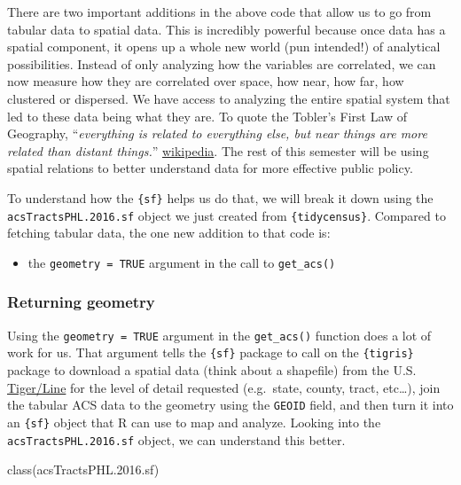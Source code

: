 \documentclass[
]{article}
\newenvironment{Shaded}{\begin{snugshade}}{\end{snugshade}}
\newcommand{\FloatTok}[1]{\textcolor[rgb]{0.00,0.00,0.81}{#1}}
\newcommand{\FunctionTok}[1]{\textcolor[rgb]{0.00,0.00,0.00}{#1}}
\newcommand{\NormalTok}[1]{#1}
\providecommand{\tightlist}{%
  \setlength{\itemsep}{0pt}\setlength{\parskip}{0pt}}
\begin{document}
There are two important additions in the above code that allow us to go
from tabular data to spatial data. This is incredibly powerful because
once data has a spatial component, it opens up a whole new world (pun
intended!) of analytical possibilities. Instead of only analyzing how
the variables are correlated, we can now measure how they are correlated
over space, how near, how far, how clustered or dispersed. We have
access to analyzing the entire spatial system that led to these data
being what they are. To quote the Tobler's First Law of Geography,
``\emph{everything is related to everything else, but near things are
more related than distant things.}''
\href{https://en.wikipedia.org/wiki/Tobler\%27s_first_law_of_geography}{wikipedia}.
The rest of this semester will be using spatial relations to better
understand data for more effective public policy.

To understand how the \texttt{\{sf\}} helps us do that, we will break it
down using the \texttt{acsTractsPHL.2016.sf} object we just created from
\texttt{\{tidycensus\}}. Compared to fetching tabular data, the one new
addition to that code is:

\begin{itemize}
\tightlist
\item
  the \texttt{geometry\ =\ TRUE} argument in the call to
  \texttt{get\_acs()}
\end{itemize}

\hypertarget{returning-geometry}{%
\subsubsection{Returning geometry}\label{returning-geometry}}

Using the \texttt{geometry\ =\ TRUE} argument in the \texttt{get\_acs()}
function does a lot of work for us. That argument tells the
\texttt{\{sf\}} package to call on the \texttt{\{tigris\}} package to
download a spatial data (think about a shapefile) from the U.S.
\href{https://www.census.gov/geographies/mapping-files/time-series/geo/tiger-line-file.html}{Tiger/Line}
for the level of detail requested (e.g.~state, county, tract,
etc\ldots), join the tabular ACS data to the geometry using the
\texttt{GEOID} field, and then turn it into an \texttt{\{sf\}} object
that R can use to map and analyze. Looking into the
\texttt{acsTractsPHL.2016.sf} object, we can understand this better.

\begin{Shaded}
\begin{Highlighting}[]
\FunctionTok{class}\NormalTok{(acsTractsPHL.}\FloatTok{2016.}\NormalTok{sf)}
\end{Highlighting}
\end{Shaded}
\end{document}
